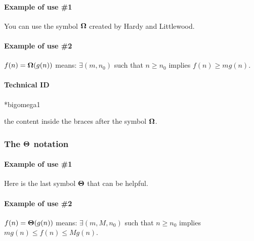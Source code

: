 \documentclass[12pt,a4paper]{article}
\makeatletter
\theoremstyle{definition}
\newcommand\IDmacro{\@ifstar{\@IDmacro@star}{\@IDmacro@no@star}}
\newcommand\@IDmacro@no@star[3]{%
        \texttt{%
        	\textbackslash#1%
        	\IfStrEq{#2}{0}{}{%
        		\,\,[#2 Option%
				\IfStrEq{#2}{1}{}{s}]%
			}%
    	    \IfStrEq{#3}{}{}{%
	    		\,\,(#3 Argument%
				\IfStrEq{#3}{1}{}{s})%
			}
	   	}
        \immediate\write\tempfile{macro,#1,#2,#3}%
    }
\newcommand\@IDmacro@star[2]{%
        \@IDmacro@no@star{#1}{0}{#2}%
    }
\newcommand\@IDoptarg{\@ifstar{\@IDoptarg@star}{\@IDoptarg@no@star}}
\newcommand\@IDoptarg@star[2]{%
    	\vspace{0.5em}
		--- \texttt{#1%
			\IfStrEq{#2}{}{:}{\,#2:}%
		}%
	}
\newcommand\@IDoptarg@no@star[2]{%
    	\IfStrEq{#2}{}{%
			\@IDoptarg@star{#1}{}%
		}{%
			\@IDoptarg@star{#1}{\##2}%
		}%
	}
\newcommand\IDarg[1]{%
    	\@IDoptarg{Argument}{#1}%
	}
\makeatother
\begin{document}
            \paragraph{Example of use \#1}

\begin{tcblisting}{}
You can use the symbol $\bigomega{}$ created by Hardy and Littlewood.
\end{tcblisting}


            \paragraph{Example of use \#2}

\begin{tcblisting}{}
$f(n) = \bigomega{g(n)}$ means: $\exists (m, n_0)$ such that
$n \geqslant n_0$ implies $f(n) \geqslant m g(n)$.
\end{tcblisting}


            \paragraph{Technical ID}

\IDmacro*{bigomega}{1}

\IDarg{} the content inside the braces after the symbol $\bigomega{}$.



        \subsubsection{\texorpdfstring{The $\bigtheta{}$ notation}%
                               {The "big Theta" notation}}

            \paragraph{Example of use \#1}

\begin{tcblisting}{}
Here is the last symbol $\bigtheta{}$ that can be helpful.
\end{tcblisting}


            \paragraph{Example of use \#2}

\begin{tcblisting}{}
$f(n) = \bigtheta{g(n)}$ means: $\exists (m, M, n_0)$ such that $n \geqslant n_0$
implies $m g(n) \leqslant f(n) \leqslant M g(n)$.
\end{tcblisting}
\end{document}
